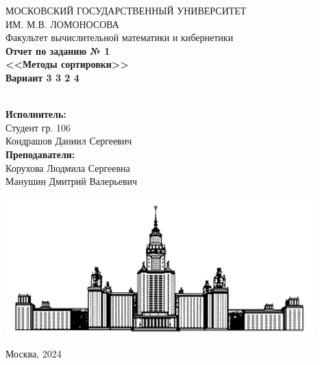 \documentclass[a4paper,11pt]{article}
\begin{document}
    \begin{center}
        МОСКОВСКИЙ ГОСУДАРСТВЕННЫЙ УНИВЕРСИТЕТ \\
        ИМ. М.В. ЛОМОНОСОВА \\
        
        
        \hfill \break
        Факультет вычислительной математики и кибернетики\\
        \vspace{2.5cm}
        \Large{\textbf{Отчет по заданию № 1}}\\
        \vspace{0.5cm}
        \large{\textbf{<<Методы сортировки>>}}\\
        \vspace{0.5cm}
        \large{\textbf{Вариант 3 3 2 4}}\\
        \hfill \break
        \\
    \end{center}
    \begin{flushright}
        \textbf{Исполнитель:}\\ 
        Студент гр. 106\\
        Кондрашов Даниил Сергеевич\\
        \vspace{0.2 cm}
        \textbf{Преподаватели:}\\ 
        Корухова Людмила Сергеевна\\ 
        Манушин Дмитрий Валерьевич \\

    \end{flushright}
    \vfill

    \begin{center}
        \includegraphics[width = 0.5\linewidth] {msu_logo}
    \end{center}
    \begin{center} 
        Москва, 2024 
    \end{center}
	\thispagestyle{empty} %

    \newpage
    \tableofcontents %

    \thispagestyle{empty} %
\end{document}
